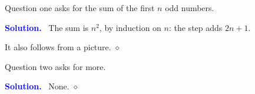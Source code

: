 \documentclass{article}
\newenvironment{solution}{\par\noindent\textbf{\textcolor{blue}{Solution.}}\ }{\hfill$\diamond$\par\medskip}
\begin{document}
Question one asks for the sum of the first $n$ odd numbers.
\begin{solution}
The sum is $n^2$, by induction on $n$: the step adds $2n+1$.

It also follows from a picture.
\end{solution}
Question two asks for more.
\begin{solution} None. \end{solution}
\end{document}
